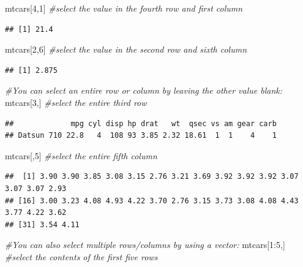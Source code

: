 \documentclass[
]{book}
\newenvironment{Shaded}{\begin{snugshade}}{\end{snugshade}}
\newcommand{\CommentTok}[1]{\textcolor[rgb]{0.56,0.35,0.01}{\textit{#1}}}
\newcommand{\DecValTok}[1]{\textcolor[rgb]{0.00,0.00,0.81}{#1}}
\newcommand{\NormalTok}[1]{#1}
\newcommand{\SpecialCharTok}[1]{\textcolor[rgb]{0.00,0.00,0.00}{#1}}
\begin{document}
\begin{Shaded}
\begin{Highlighting}[]
\NormalTok{mtcars[}\DecValTok{4}\NormalTok{,}\DecValTok{1}\NormalTok{] }\CommentTok{\#select the value in the fourth row and first column}
\end{Highlighting}
\end{Shaded}

\begin{verbatim}
## [1] 21.4
\end{verbatim}

\begin{Shaded}
\begin{Highlighting}[]
\NormalTok{mtcars[}\DecValTok{2}\NormalTok{,}\DecValTok{6}\NormalTok{] }\CommentTok{\#select the value in the second row and sixth column}
\end{Highlighting}
\end{Shaded}

\begin{verbatim}
## [1] 2.875
\end{verbatim}

\begin{Shaded}
\begin{Highlighting}[]
\CommentTok{\#You can select an entire row or column by leaving the other value blank: }
\NormalTok{mtcars[}\DecValTok{3}\NormalTok{,] }\CommentTok{\#select the entire third row}
\end{Highlighting}
\end{Shaded}

\begin{verbatim}
##             mpg cyl disp hp drat   wt  qsec vs am gear carb
## Datsun 710 22.8   4  108 93 3.85 2.32 18.61  1  1    4    1
\end{verbatim}

\begin{Shaded}
\begin{Highlighting}[]
\NormalTok{mtcars[,}\DecValTok{5}\NormalTok{] }\CommentTok{\#select the entire fifth column}
\end{Highlighting}
\end{Shaded}

\begin{verbatim}
##  [1] 3.90 3.90 3.85 3.08 3.15 2.76 3.21 3.69 3.92 3.92 3.92 3.07 3.07 3.07 2.93
## [16] 3.00 3.23 4.08 4.93 4.22 3.70 2.76 3.15 3.73 3.08 4.08 4.43 3.77 4.22 3.62
## [31] 3.54 4.11
\end{verbatim}

\begin{Shaded}
\begin{Highlighting}[]
\CommentTok{\#You can also select multiple rows/columns by using a vector:}
\NormalTok{mtcars[}\DecValTok{1}\SpecialCharTok{:}\DecValTok{5}\NormalTok{,] }\CommentTok{\#select the contents of the first five rows}
\end{Highlighting}
\end{Shaded}
\end{document}
